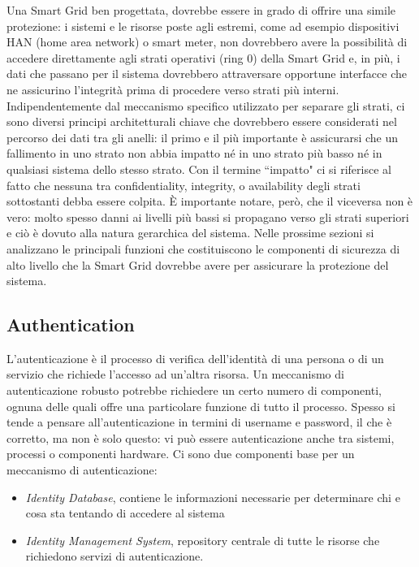 Una Smart Grid ben progettata, dovrebbe essere in grado di offrire una simile protezione: i sistemi e le risorse poste agli estremi, come ad esempio dispositivi HAN (home area network) o smart meter, non dovrebbero avere la possibilità di accedere direttamente agli strati operativi (ring 0) della Smart Grid e, in più, i dati che passano per il sistema dovrebbero attraversare opportune interfacce che ne assicurino l'integrità prima di procedere verso strati più interni. \newline
Indipendentemente dal meccanismo specifico utilizzato per separare gli strati, ci sono diversi principi architetturali chiave che dovrebbero essere considerati nel percorso dei dati tra gli anelli: il primo e il più importante è assicurarsi che un fallimento in uno strato non abbia impatto né in uno strato più basso né in qualsiasi sistema dello stesso strato. Con il termine ``impatto" ci si riferisce al fatto che nessuna tra confidentiality, integrity, o availability degli strati sottostanti debba essere colpita. È importante notare, però, che il viceversa non è vero: molto spesso danni ai livelli più bassi si propagano verso gli strati superiori e ciò è dovuto alla natura gerarchica del sistema.
\newline \newline 
Nelle prossime sezioni si analizzano le principali funzioni che costituiscono le componenti di sicurezza di alto livello che la Smart Grid dovrebbe avere per assicurare la protezione del sistema.

\subsection{Authentication}
L'autenticazione è il processo di verifica dell'identità di una persona o di un servizio che richiede l'accesso ad un'altra risorsa. \newline Un meccanismo di autenticazione robusto potrebbe richiedere un certo numero di componenti, ognuna delle quali offre una particolare funzione di tutto il processo. \newline Spesso si tende a pensare all'autenticazione in termini di username e password, il che è corretto, ma non è solo questo: vi può essere autenticazione anche tra sistemi, processi o componenti hardware. Ci sono due componenti base per un meccanismo di autenticazione:
\begin{itemize}
\item \textit{Identity Database}, contiene le informazioni necessarie per determinare chi e cosa sta tentando di accedere al sistema
\item \textit{Identity Management System}, repository centrale di tutte le risorse che richiedono servizi di autenticazione.
\end{itemize}

